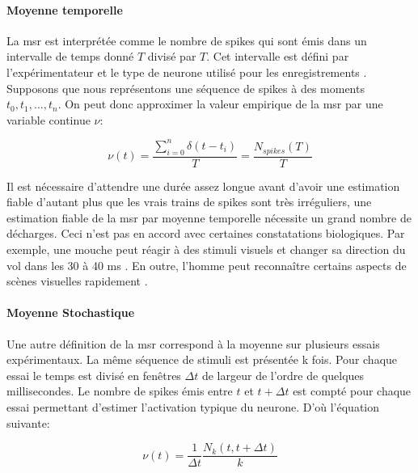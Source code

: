 \paragraph{Moyenne temporelle}

La \gls{msr} est interprétée comme le nombre de spikes qui sont émis dans un intervalle de temps donné $T$ divisé par $T$. Cet intervalle est défini par l'expérimentateur et le type de neurone utilisé pour les enregistrements \cite{Adrian:1926, Kandel:1991}. Supposons que nous représentons une séquence de spikes à des moments ${t_0,t_1,. . . , t_n}$. On peut donc approximer la valeur empirique de la \gls{msr} par une variable continue $\nu$:\\

\begin{center}
\begin{equation} 
\nu(t) = \frac {\sum_{i=0}^{n}{\delta (t-t_i)}}{T} =\frac{N_ {spikes} (T) }{T}
 \end{equation}
\end{center}

Il est nécessaire d'attendre une durée assez longue avant d'avoir une estimation fiable d'autant plus que les vrais trains de spikes sont très irréguliers, une estimation fiable de la \gls{msr} par moyenne temporelle nécessite un grand nombre de décharges. Ceci n'est pas en accord avec certaines constatations biologiques. Par exemple, une mouche peut réagir à des stimuli visuels et changer sa direction du vol dans les 30 à 40 ms \cite{Rieke:1997}. En outre, l'homme peut reconnaître certains aspects de scènes visuelles rapidement \cite{Thorpe:1996, Keysers:2001}.\\

\paragraph{Moyenne Stochastique}

Une autre définition de la \gls{msr} correspond à la moyenne sur plusieurs essais expérimentaux. La même séquence de stimuli est présentée k fois. Pour chaque essai le temps est divisé en fenêtres $\Delta t$ de largeur de l'ordre de quelques millisecondes. Le nombre de spikes émis entre $t$ et $t+\Delta t$ est compté pour chaque essai permettant d'estimer l'activation typique du neurone. D'où l'équation suivante:\\

\begin{center}
\begin{equation} 
\nu(t)= \frac {1}{\Delta t}\frac{N_ {k} (t,t+\Delta t) }{k} 
 \end{equation}
\end{center}

